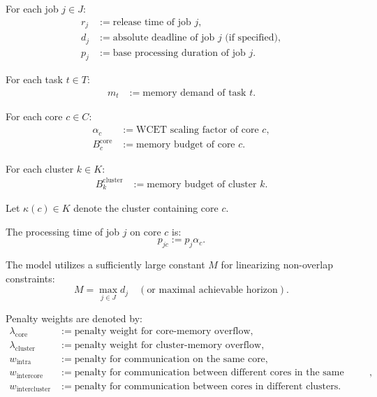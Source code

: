 \documentclass[11pt,a4paper]{article}
\begin{document}
For each job $j \in J$:
\begin{align*}
r_j &:= \text{release time of job } j,\\
d_j &:= \text{absolute deadline of job } j \text{ (if specified)},\\
p_j &:= \text{base processing duration of job } j.
\end{align*}

For each task $t \in T$:
\begin{align*}
m_t &:= \text{memory demand of task } t.
\end{align*}

For each core $c \in C$:
\begin{align*}
\alpha_c &:= \text{WCET scaling factor of core } c,\\
B_c^{\mathrm{core}} &:= \text{memory budget of core } c.
\end{align*}

For each cluster $k \in K$:
\begin{align*}
B_k^{\mathrm{cluster}} &:= \text{memory budget of cluster } k.
\end{align*}

Let $\kappa(c) \in K$ denote the cluster containing core $c$.

The processing time of job $j$ on core $c$ is:
\begin{equation}
p_{jc} := p_j \alpha_c.
\end{equation}

The model utilizes a sufficiently large constant $M$ for linearizing non-overlap constraints:
\begin{equation}
M = \max_{j \in J} d_j \quad (\text{or maximal achievable horizon}).
\end{equation}

Penalty weights are denoted by:
\begin{align*}
\lambda_{\mathrm{core}} &:= \text{penalty weight for core-memory overflow},\\
\lambda_{\mathrm{cluster}} &:= \text{penalty weight for cluster-memory overflow},\\
w_{\mathrm{intra}} &:= \text{penalty for communication on the same core},\\
w_{\mathrm{intercore}} &:= \text{penalty for communication between different cores in the same cluster},\\
w_{\mathrm{intercluster}} &:= \text{penalty for communication between cores in different clusters}.
\end{align*}
\end{document}
